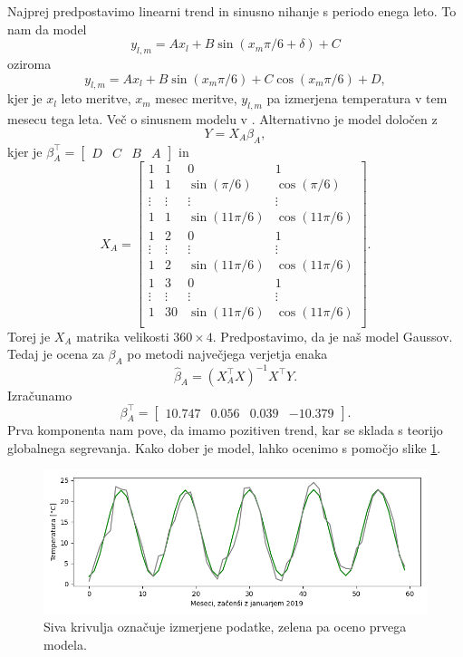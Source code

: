 \documentclass[12pt, a4paper]{article}
\begin{document}
Najprej predpostavimo linearni trend in sinusno nihanje s periodo 
enega leto. To nam da model
\[
    y_{l,m} = Ax_l + B\sin(x_m\pi/6 + \delta) + C
\]
oziroma
\[
    y_{l,m} = Ax_l + B\sin(x_m\pi/6) + C\cos(x_m\pi/6) + D,
\]
kjer je $x_l$ leto meritve, $x_m$ mesec meritve, $y_{l,m}$ pa 
izmerjena temperatura v tem mesecu tega leta. Več o sinusnem 
modelu v \cite{wiki:Sinusoidal_model}. Alternativno je model 
določen z
\[
    Y = X_A\beta_A,
\]
kjer je $\beta_A^\top = \begin{bmatrix}
    D & C & B & A
\end{bmatrix}$ in
\[
    X_A = \begin{bmatrix}
        1 & 1 & 0 & 1 \\
        1 & 1 & \sin\left(\pi/6\right) & \cos\left(\pi/6\right) \\
        \vdots & \vdots & \vdots & \vdots \\
        1 & 1 &  \sin\left(11\pi/6\right) & \cos\left(11\pi/6\right) \\
        1 & 2 & 0 & 1 \\
        \vdots & \vdots & \vdots & \vdots \\
        1 & 2 &  \sin\left(11\pi/6\right) & \cos\left(11\pi/6\right) \\
        1 & 3 &  0 & 1 \\
        \vdots & \vdots & \vdots & \vdots \\
        1 & 30 & \sin\left(11\pi/6\right) & \cos\left(11\pi/6\right)\\
        \end{bmatrix}.
\]
Torej je $X_A$ matrika velikosti $360 \times 4$. Predpostavimo, da je 
naš model Gaussov. Tedaj je ocena za $\beta_A$ po metodi največjega 
verjetja enaka
\[
    \hat \beta_A = (X_A^\top X)^{-1} X^\top Y.
\]
Izračunamo
\[
    \beta_A^\top = \begin{bmatrix}
        10.747 & 0.056 & 0.039 & -10.379
    \end{bmatrix}.
\]
Prva komponenta nam pove, da imamo pozitiven trend, kar se sklada 
s teorijo globalnega segrevanja. Kako dober je model, lahko ocenimo s pomočjo slike 
\ref{png:prvi}.
\begin{figure}[H]
    \centering
    \includegraphics[width=14cm]{Slike/prvi_model.png}
    \caption{Siva krivulja označuje izmerjene podatke, zelena pa oceno 
    prvega modela.}
    \label{png:prvi}
\end{figure}
\end{document}
